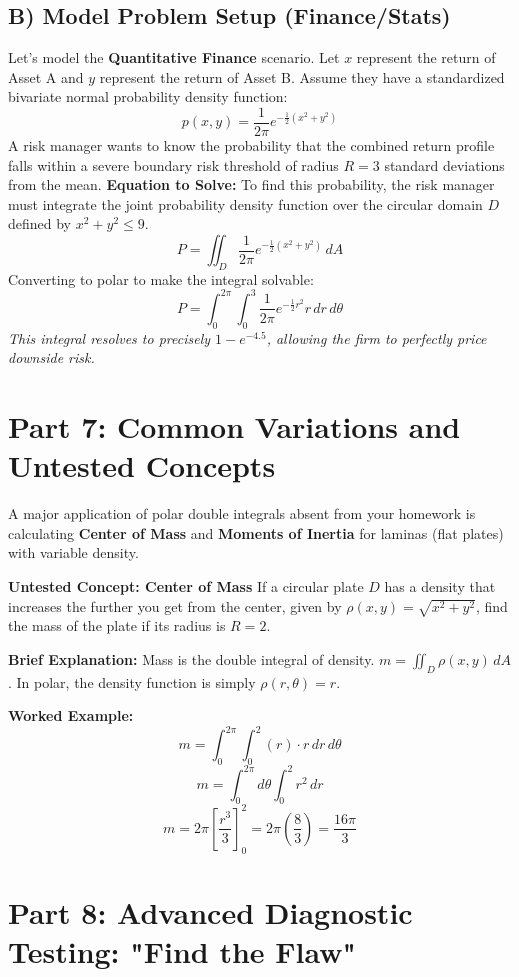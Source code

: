 \documentclass[12pt]{article}
\begin{document}
\subsection{B) Model Problem Setup (Finance/Stats)}
Let's model the \textbf{Quantitative Finance} scenario. 
Let $x$ represent the return of Asset A and $y$ represent the return of Asset B. Assume they have a standardized bivariate normal probability density function:
\[ p(x,y) = \frac{1}{2\pi} e^{-\frac{1}{2}(x^2+y^2)} \]
A risk manager wants to know the probability that the combined return profile falls within a severe boundary risk threshold of radius $R = 3$ standard deviations from the mean.
\textbf{Equation to Solve:}
To find this probability, the risk manager must integrate the joint probability density function over the circular domain $D$ defined by $x^2 + y^2 \le 9$.
\[ P = \iint_D \frac{1}{2\pi} e^{-\frac{1}{2}(x^2+y^2)} \, dA \]
Converting to polar to make the integral solvable:
\[ P = \int_0^{2\pi} \int_0^3 \frac{1}{2\pi} e^{-\frac{1}{2}r^2} r \, dr \, d\theta \]
\textit{This integral resolves to precisely $1 - e^{-4.5}$, allowing the firm to perfectly price downside risk.}

\newpage
\section{Part 7: Common Variations and Untested Concepts}

A major application of polar double integrals absent from your homework is calculating \textbf{Center of Mass} and \textbf{Moments of Inertia} for laminas (flat plates) with variable density.

\textbf{Untested Concept: Center of Mass}
If a circular plate $D$ has a density that increases the further you get from the center, given by $\rho(x,y) = \sqrt{x^2+y^2}$, find the mass of the plate if its radius is $R=2$.

\textbf{Brief Explanation:}
Mass is the double integral of density. $m = \iint_D \rho(x,y) \, dA$. In polar, the density function is simply $\rho(r,\theta) = r$. 

\textbf{Worked Example:}
\[ m = \int_0^{2\pi} \int_0^2 (r) \cdot r \, dr \, d\theta \]
\[ m = \int_0^{2\pi} d\theta \int_0^2 r^2 \, dr \]
\[ m = 2\pi \left[ \frac{r^3}{3} \right]_0^2 = 2\pi \left( \frac{8}{3} \right) = \frac{16\pi}{3} \]

\newpage
\section{Part 8: Advanced Diagnostic Testing: "Find the Flaw"}
\end{document}
